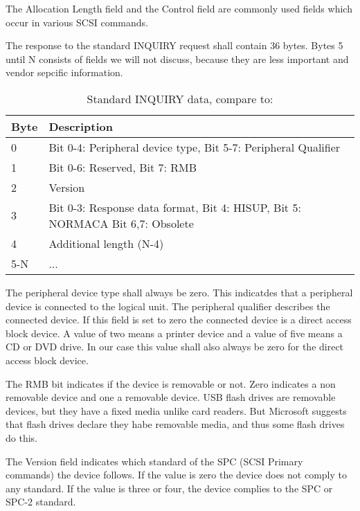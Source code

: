 The Allocation Length field and the Control field are commonly used fields which occur in various SCSI commands\cite{scsi_seagate}.

The response to the standard INQUIRY request shall contain 36 bytes\cite{scsi_seagate}. Bytes 5 until N consists of fields we will not discuss, because they are less important and vendor sepcific information.

\begin{table}[ht]
\caption{Standard INQUIRY data, compare to: \cite{usb_ms_jan, scsi_seagate}}
\centering
\begin{tabular}{|l|l|}
\hline\hline
\textbf{Byte} & \textbf{Description}\\ \hline
0 & Bit 0-4: Peripheral device type, Bit 5-7: Peripheral Qualifier \\ \hline
1 & Bit 0-6: Reserved, Bit 7: RMB \\ \hline
2 & Version \\ \hline
3 & Bit 0-3: Response data format, Bit 4: HISUP, Bit 5: NORMACA Bit 6,7: Obsolete \\ \hline
4 & Additional length (N-4) \\ \hline
5-N & ... \\ \hline
\end{tabular}
\label{table:inquiry_data}
\end{table}

The peripheral device type shall always be zero. This indicatdes that a peripheral device is connected to the logical unit. The peripheral qualifier describes the connected device. If this field is set to zero the connected device is a direct access block device. A value of two means a printer device and a value of five means a CD or DVD drive\cite{usb_ms_jan, scsi_seagate}. In our case this value shall also always be zero for the direct access block device.

The RMB bit indicates if the device is removable or not. Zero indicates a non removable device and one a removable device. USB flash drives are removable devices, but they have a fixed media unlike card readers. But Microsoft suggests that flash drives declare they habe removable media, and thus some flash drives do this\cite{usb_ms_jan}.

The Version field indicates which standard of the SPC (SCSI Primary commands) the device follows. If the value is zero the device does not comply to any standard. If the value is three or four, the device complies to the SPC or SPC-2 standard\cite{usb_ms_jan, scsi_seagate}.

